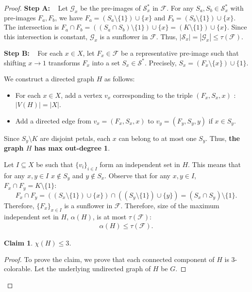 \documentclass[runningheads,12pt,a4paper]{article}
\newtheorem{claim}{Claim}
\begin{document}
\begin{proof}
		
		{\noindent \bf Step A:} ~ Let $\mathcal{G}_x$ be the pre-images of $\mathcal{S}^*_x$ in $\mathcal{F}$. For any $S_a, S_b \in \mathcal{S}^*_x$ with pre-images $F_a, F_b$, we have $F_a = (S_a \setminus \{1\}) \cup \{x\}$ and $F_b = (S_b \setminus \{1\}) \cup \{x\}$. The intersection is $F_a \cap F_b = ((S_a \cap S_b) \setminus \{1\}) \cup \{x\} = (K \setminus \{1\}) \cup \{x\}$. Since this intersection is constant, $\mathcal{G}_x$ is a sunflower in $\mathcal{F}$. Thus, $|\mathcal{S}_x| = |\mathcal{G}_x| \leq \tau(\mathcal{F})$.
		
		{\noindent \bf Step B:} ~ 
		For each $x \in X$, let $F_x \in \mathcal{F}$ be a representative pre-image such that shifting $x \to 1$ transforms $F_x$ into a set $S_x \in \mathcal{S}^*$.
		Precisely, $S_x = (F_x \setminus \{x\}) \cup \{1\}$.
		
		We construct a directed graph $H$ as follows:
		\begin{itemize}
			\item For each $x \in X$, add a vertex $v_x$ corresponding to the triple $(F_x,S_x,x)$ : $|V(H)|=|X|$.
			\item  Add a directed edge from $v_x=(F_x,S_x,x)$ to $v_y=(F_y,S_y,y)$ if
			$x \in S_y$.
		\end{itemize}
		
		Since $S_y \setminus K$ are disjoint petals, each $x$ can belong to at most one $S_y$. Thus, {\bf the graph $H$ has max out-degree 1}.
		
		Let $I \subseteq X$ be such that $\{v_i\}_{i\in I}$ form an independent set in $H$. This means that for any $x,y \in I$
		$x \not\in S_y$ and $y \not\in S_x$.
		Observe that for any $x,y \in I$, 
		$F_x \cap F_y =K \setminus \{1\}$: $$F_x \cap F_y = \left( (S_x \setminus \{1\}) \cup \{x\} \right) \cap \left( (S_y \setminus \{1\}) \cup \{y\} \right)=(S_x \cap S_y)\setminus \{1\}.$$
		Therefore, $\{F_x\}_{x \in I}$ is a sunflower in $\mathcal{F}$. Therefore, size of the maximum independent set in $H$, $\alpha(H)$, is at most $\tau(\mathcal{F})$:
		\begin{align}\label{eq:imp}
			\alpha(H) \le \tau(\mathcal{F}).
		\end{align}
		
		\begin{claim}
			$\chi(H) \leq 3$.
		\end{claim}
		\begin{proof}
			To prove the claim, we prove that each connected component of $H$ is 3-colorable. Let the underlying undirected graph of $H$ be $G$.
			

\end{proof}
\end{proof}
\end{document}
